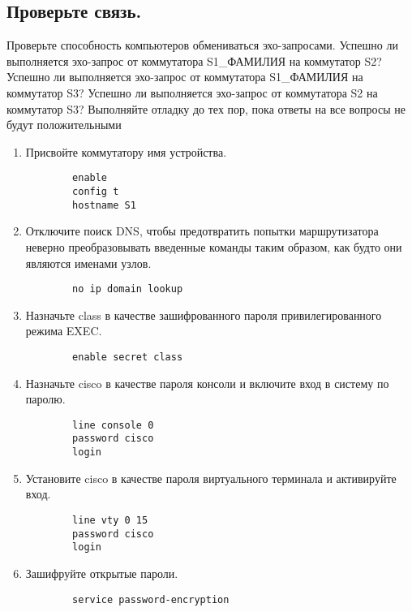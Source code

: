 \subsection{Проверьте связь.}
Проверьте способность компьютеров обмениваться эхо-запросами.
Успешно ли выполняется эхо-запрос от коммутатора S1\_ФАМИЛИЯ на
коммутатор S2? Успешно ли выполняется эхо-запрос от коммутатора
S1\_ФАМИЛИЯ на коммутатор S3? Успешно ли выполняется эхо-запрос от
коммутатора S2 на коммутатор S3?
Выполняйте отладку до тех пор, пока ответы на все вопросы не будут положительными

\begin{enumerate}[a]
    \item Присвойте коммутатору имя устройства.
    \begin{verbatim}
        enable
        config t
        hostname S1
    \end{verbatim}

    \item Отключите поиск DNS, чтобы предотвратить попытки маршрутизатора неверно преобразовывать
    введенные команды таким образом, как будто они являются именами узлов.
    \begin{verbatim}
        no ip domain lookup
    \end{verbatim}

    \item Назначьте class в качестве зашифрованного пароля привилегированного режима EXEC\@.
    \begin{verbatim}
        enable secret class
    \end{verbatim}

    \item Назначьте cisco в качестве пароля консоли и включите вход в систему по паролю.
    \begin{verbatim}
        line console 0
        password cisco
        login
    \end{verbatim}

    \item Установите cisco в качестве пароля виртуального терминала и активируйте вход.
    \begin{verbatim}
        line vty 0 15
        password cisco
        login
    \end{verbatim}

    \item Зашифруйте открытые пароли.
    \begin{verbatim}
        service password-encryption
    \end{verbatim}


\end{enumerate}
